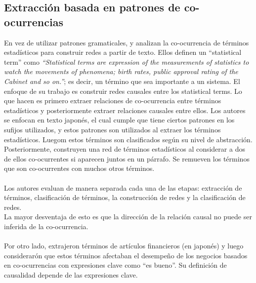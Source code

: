 \documentclass[11pt]{article}
\theoremstyle{plain}
\begin{document}
\subsection{Extracción basada en patrones de co-ocurrencias}
En vez de utilizar patrones gramaticales, \cite{saito2007extraction} y \cite{perrin2008global} analizan la co-ocurrencia de términos estadísticos para construir redes a partir de texto. Ellos definen un “statistical term” como \textit{“Statistical terms are expression of the measurements of statistics to watch the movements of phenomena; birth rates, public approval rating of the Cabinet and so on.”}; es decir, un término que sea importante a un sistema. El enfoque de su trabajo es construir redes causales entre los statistical terms. Lo que hacen es primero extraer relaciones de co-ocurrencia entre términos estadísticos y posteriormente extraer relaciones causales entre ellos. Los autores se enfocan en texto japonés, el cual cumple que tiene ciertos patrones en los sufijos utilizados, y estos patrones son utilizados al extraer los términos estadísticos. Luegom estos términos son clasificados según su nivel de abstracción. Posteriormente, construyen una red de términos estadísticos al considerar a dos de ellos co-ocurrentes si aparecen juntos en un párrafo. Se remueven los términos que son co-ocurrentes con muchos otros términos.\\
\\
Los autores evaluan de manera separada cada una de las etapas: extracción de términos, clasificación de términos, la construcción de redes y la clasificación de redes.
\\
La mayor desventaja de esto es que la dirección de la relación causal no puede ser inferida de la co-ocurrencia.\\
\\
Por otro lado, \cite{sakai2008cause} extrajeron términos de artículos financieros (en japonés) y luego considerarón que estos términos afectaban el desempeño de los negocios basados en co-ocurrencias con expresiones clave como “es bueno”. Su definición de causalidad depende de las expresiones clave.
\end{document}
